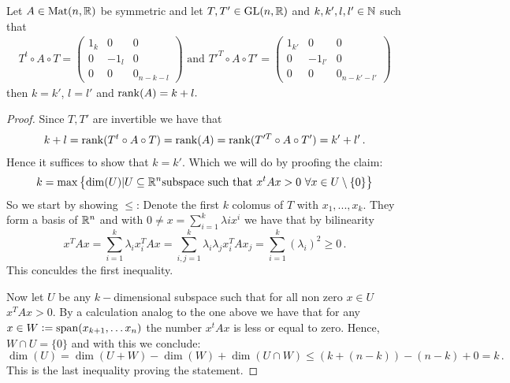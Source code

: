 \begin{theorem}
Let $A\in \mathrm{Mat}(n,\mathbb{R})$ be symmetric and let $T,T'\in \mathrm{GL}(n,\mathbb{R})$ and $k,k',l,l'\in \mathbb{N}$ such that \\
\begin{align*}
T^t\circ A\circ T=	\begin{pmatrix}
		1_k& 0 &0\\
		0& -1_l&0\\
		0&0&0_{n-k-l}
	\end{pmatrix}\text{ and } 
	T'^T\circ A \circ T'=
	\begin{pmatrix}
		1_{k'}& 0 &0\\
		0& -1_{l'}&0\\
		0&0&0_{n-k'-l'}
	\end{pmatrix}
\end{align*}
then $k=k'$, $l=l'$ and $\operatorname{\mathrm{rank}}(A)=k+l.$
\end{theorem}
\begin{proof}
	Since $T,T'$ are invertible we have that
	\begin{align}
		k+l=\operatorname{\mathrm{rank}}(T^t\circ A\circ T)=\operatorname{\mathrm{rank}}(A)=\operatorname{\mathrm{rank}}(T'^T\circ A\circ T')=k'+l' \, .
	\end{align} Hence it suffices to show that $k=k'$. Which we will do by proofing the claim:
	\begin{equation*}
		k=\max \left\{ \dim(U)|U\subseteq \mathbb{R}^n \text{subspace such that } x^tAx>0 ~\forall x\in U\setminus \{0\}  \right\}
	\end{equation*}
	So we start by showing \glqq $\leq $\grqq:
	Denote the first $k$ colomus of $T$ with $x_1,...,x_k$. They form a basis of $\mathbb{R}^n$ and with $ 0 \neq x=\sum_{i=1}^k\lambda ix^i$ we have that by bilinearity
	\begin{equation}
		x^TAx=\sum_{i=1}^{k}\lambda_i x_i^T A x=\sum_{i,j=1}^{k}\lambda_i \lambda_j x_i^T A x_j=\sum_{i=1}^{k}(\lambda_i)^2\geq 0 \,. 
	\end{equation} This conculdes the first inequality. 
	
	Now let $U$ be any $k-$dimensional subspace such that for all non zero $x\in U$ $x^TAx>0$. By a calculation analog to the one above we have that for any $x\in W:= \mathrm{span} (x_{k+1},\dots x_n)$ the number $x^tAx$ is less or equal to zero. Hence, $W\cap U= \{0\}$ and with this we conclude:
	\begin{equation}
		\dim(U)=\dim(U+W)-\dim(W)+\dim(U\cap W)\leq (k+(n-k))-(n-k)+0=k\, .
	\end{equation} This is the last inequality proving the statement.
	\end{proof}
